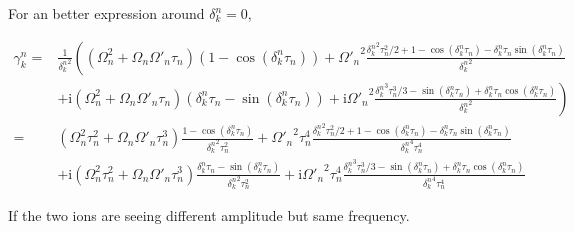 \documentclass[10pt,fleqn]{article}
\newcommand{\ui}{\mathrm{i}}
\newcommand{\eqar}[1]
{
  \begin{align*}
    #1
  \end{align*}
}
\newcommand{\paren}[1]{{\left({#1}\right)}}
\newcommand{\lparen}[1]{{\left({#1}\right.}}
\newcommand{\rparen}[1]{{\left.{#1}\right)}}
\begin{document}
For an better expression around $\delta_k^n=0$,
\eqar{
  \gamma_k^n=&\frac{1}{{\delta_k^n}^2}
  \lparen{
    \paren{\Omega_n^2+\Omega_n\Omega'_n\tau_n}\paren{1-\cos\paren{{\delta_k^n}\tau_n}}
    +{\Omega'_n}^2\frac{{\delta_k^n}^2\tau_n^2/2+1-\cos\paren{{\delta_k^n}\tau_n}
      -{\delta_k^n}\tau_n\sin\paren{{\delta_k^n}\tau_n}}{{\delta_k^n}^2}
  }\\
  &\rparen{
    +\ui\paren{\Omega_n^2+\Omega_n\Omega'_n\tau_n}\paren{\delta_k^n\tau_n-\sin\paren{{\delta_k^n}\tau_n}}
    +\ui{\Omega'_n}^2\frac{
      {\delta_k^n}^3\tau_n^3/3
      -\sin\paren{{\delta_k^n}\tau_n}
      +{\delta_k^n}\tau_n\cos\paren{{\delta_k^n}\tau_n}
    }{{\delta_k^n}^2}
  }\\
  =&\paren{\Omega_n^2\tau_n^2+\Omega_n\Omega'_n\tau_n^3}\frac{1-\cos\paren{{\delta_k^n}\tau_n}}{{\delta_k^n}^2\tau_n^2}
  +{\Omega'_n}^2\tau_n^4\frac{{\delta_k^n}^2\tau_n^2/2+1-\cos\paren{{\delta_k^n}\tau_n}
    -{\delta_k^n}\tau_n\sin\paren{{\delta_k^n}\tau_n}}{{\delta_k^n}^4\tau_n^4}\\
  &+\ui\paren{\Omega_n^2\tau_n^2+\Omega_n\Omega'_n\tau_n^3}\frac{\delta_k^n\tau_n-\sin\paren{{\delta_k^n}\tau_n}}{{\delta_k^n}^2\tau_n^2}
  +\ui{\Omega'_n}^2\tau_n^4\frac{
    {\delta_k^n}^3\tau_n^3/3
    -\sin\paren{{\delta_k^n}\tau_n}
    +{\delta_k^n}\tau_n\cos\paren{{\delta_k^n}\tau_n}
  }{{\delta_k^n}^4\tau_n^4}
}

If the two ions are seeing different amplitude but same frequency.
\end{document}
